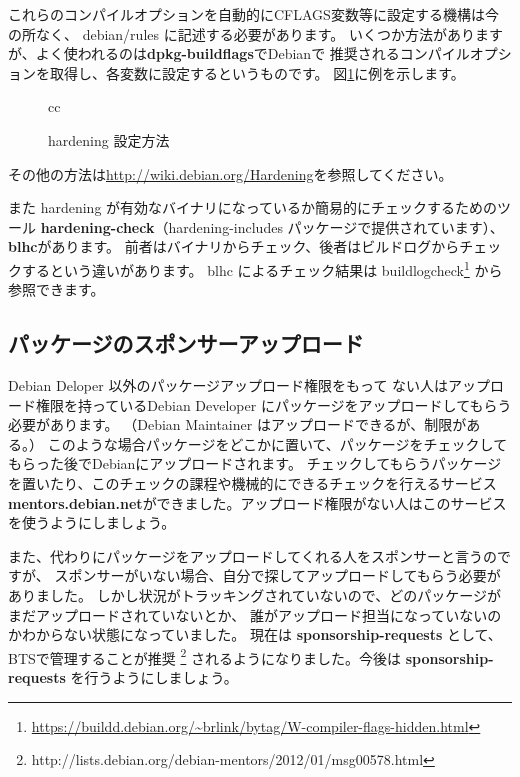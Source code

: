 \documentclass[mingoth,a4paper]{jsarticle}
\begin{document}
これらのコンパイルオプションを自動的にCFLAGS変数等に設定する機構は今の所なく、
debian/rules に記述する必要があります。
いくつか方法がありますが、よく使われるのは{\bf dpkg-buildflags}でDebianで
推奨されるコンパイルオプションを取得し、各変数に設定するというものです。
図\ref{fig:hardening_setting}に例を示します。

\begin{figure}[h]
\begin{tabular}{cc}
\end{tabular}
\caption{hardening 設定方法}
\label{fig:hardening_setting}
\end{figure}

その他の方法は\url{http://wiki.debian.org/Hardening}を参照してください。

また hardening が有効なバイナリになっているか簡易的にチェックするためのツール
{\bf hardening-check}（hardening-includes パッケージで提供されています）、{\bf blhc}があります。
前者はバイナリからチェック、後者はビルドログからチェックするという違いがあります。
blhc によるチェック結果は buildlogcheck\footnote{\url{https://buildd.debian.org/~brlink/bytag/W-compiler-flags-hidden.html}}
から参照できます。

\subsection{パッケージのスポンサーアップロード}

Debian Deloper 以外のパッケージアップロード権限をもって
ない人はアップロード権限を持っているDebian Developer にパッケージをアップロードしてもらう必要があります。
（Debian Maintainer はアップロードできるが、制限がある。）
このような場合パッケージをどこかに置いて、パッケージをチェックしてもらった後でDebianにアップロードされます。
チェックしてもらうパッケージを置いたり、このチェックの課程や機械的にできるチェックを行えるサービス
{\bf mentors.debian.net}ができました。アップロード権限がない人はこのサービスを使うようにしましょう。

また、代わりにパッケージをアップロードしてくれる人をスポンサーと言うのですが、
スポンサーがいない場合、自分で探してアップロードしてもらう必要がありました。
しかし状況がトラッキングされていないので、どのパッケージがまだアップロードされていないとか、
誰がアップロード担当になっていないのかわからない状態になっていました。
現在は {\bf sponsorship-requests} として、BTSで管理することが推奨
\footnote{http://lists.debian.org/debian-mentors/2012/01/msg00578.html}
されるようになりました。今後は {\bf sponsorship-requests} を行うようにしましょう。
\end{document}
